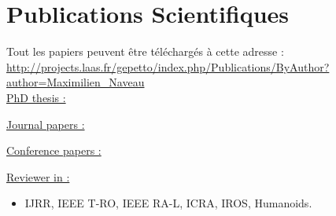 \documentclass[11pt,a4paper,sans]{moderncv}        %
\newcommand{\items}{\item \hspace{2mm}}
\begin{document}
\section{Publications Scientifiques}

\toggletrue{myrefs}

Tout les papiers peuvent \^etre t\'el\'echarg\'es \`a cette adresse :
\url{http://projects.laas.fr/gepetto/index.php/Publications/ByAuthor?author=Maximilien_Naveau}\\

\large{\underline{PhD thesis :}}

\begin{itemize}%
\normalsize{\items} \footnotesize{}
\end{itemize}

\large{\underline{Journal papers :}}

\begin{itemize}%
\normalsize{\items} \footnotesize{}
\normalsize{\items} \footnotesize{}
\end{itemize}%


\large{\underline{Conference papers :}}

\begin{itemize}%
\normalsize{\items} \footnotesize{}
\normalsize{\items} \footnotesize{}
\normalsize{\items} \footnotesize{}
\normalsize{\items} \footnotesize{}
\normalsize{\items} \footnotesize{}
\normalsize{\items} \footnotesize{}
\end{itemize}

\newsavebox\mytempbib
\savebox\mytempbib{\parbox{\textwidth}{}}


\large{\underline{Reviewer in :}}
\begin{itemize}%
\items IJRR, IEEE T-RO, IEEE RA-L, ICRA, IROS, Humanoids.
\end{itemize}

%
\end{document}
